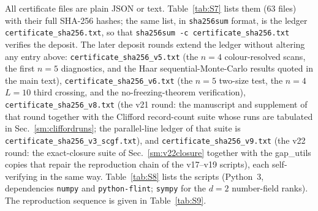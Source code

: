 \documentclass[aps,prx,reprint,superscriptaddress,nobibnotes,longbibliography]{revtex4-2}
\begin{document}
All certificate files are plain JSON or text.  Table~\ref{tab:S7} lists them ($63$ files) with their full SHA-256 hashes; the same list, in \texttt{sha256sum} format, is the ledger \texttt{certificate\_sha256.txt}, so that \texttt{sha256sum -c certificate\_sha256.txt} verifies the deposit.  The later deposit rounds extend the ledger without altering any entry above: \texttt{certificate\_sha256\_v5.txt} (the $n=4$ colour-resolved scans, the first $n=5$ diagnostics, and the Haar sequential-Monte-Carlo results quoted in the main text), \texttt{certificate\_sha256\_v6.txt} (the $n=5$ two-size test, the $n=4$ $L=10$ third crossing, and the no-freezing-theorem verification), \texttt{certificate\_sha256\_v8.txt} (the v21 round: the manuscript and supplement of that round together with the Clifford record-count suite whose runs are tabulated in Sec.~\ref{sm:cliffordruns}; the parallel-line ledger of that suite is \texttt{certificate\_sha256\_v3\_scgf.txt}), and \texttt{certificate\_sha256\_v9.txt} (the v22 round: the exact-closure suite of Sec.~\ref{sm:v22closure} together with the gap\_utils copies that repair the reproduction chain of the v17--v19 scripts), each self-verifying in the same way.  Table~\ref{tab:S8} lists the scripts (Python~3, dependencies \texttt{numpy} and \texttt{python-flint}; \texttt{sympy} for the $d=2$ number-field ranks).  The reproduction sequence is given in Table~\ref{tab:S9}.
\end{document}
